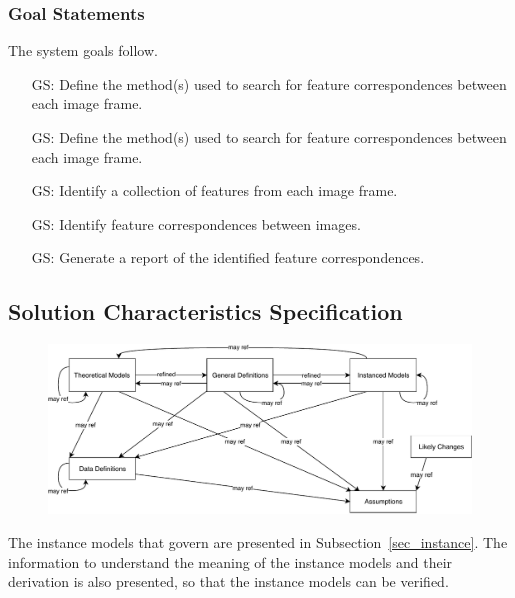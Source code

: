\documentclass[12pt]{article}
\newcounter{goalnum} %
\begin{document}
\subsubsection{Goal Statements}
\noindent The system goals follow.

\begin{itemize}

  \item[GS\refstepcounter{goalnum}\thegoalnum \label{define_features}:]
    Define the method(s) used to search for feature correspondences between each image frame.
    
  \item[GS\refstepcounter{goalnum}\thegoalnum \label{compare_features}:]
    Define the method(s) used to search for feature correspondences between each image frame.
  
  \item[GS\refstepcounter{goalnum}\thegoalnum \label{identify_features}:]
    Identify a collection of features from each image frame. 
  
  \item[GS\refstepcounter{goalnum}\thegoalnum \label{identify_matches}:] 
    Identify feature correspondences between images.
  
  \item[GS\refstepcounter{goalnum}\thegoalnum \label{report_matches}:]
    Generate a report of the identified feature correspondences.
    
\end{itemize}

\subsection{Solution Characteristics Specification}
\begin{figure}[H]
  \includegraphics[scale=0.9]{RelationsBetweenTM_GD_IM_DD_A.pdf}
\end{figure}

The instance models that govern \progname{} are presented in
Subsection~\ref{sec_instance}.  The information to understand the meaning of the
instance models and their derivation is also presented, so that the instance
models can be verified.
\end{document}
